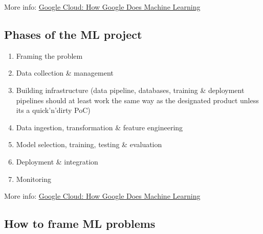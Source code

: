 \documentclass[
]{book}
\begin{document}
More info: \href{https://www.cloudskillsboost.google/course_templates/10}{Google Cloud: How Google Does Machine
Learning}

\hypertarget{phases-of-the-ml-project}{%
\subsection{Phases of the ML project}\label{phases-of-the-ml-project}}

\begin{enumerate}
\def\labelenumi{\arabic{enumi}.}
\item
  Framing the problem
\item
  Data collection \& management
\item
  Building infrastructure (data pipeline, databases, training \&
  deployment pipelines should at least work the same way as the
  designated product unless its a quick'n'dirty PoC)
\item
  Data ingestion, transformation \& feature engineering
\item
  Model selection, training, testing \& evaluation
\item
  Deployment \& integration
\item
  Monitoring
\end{enumerate}

More info: \href{https://www.cloudskillsboost.google/course_templates/10}{Google Cloud: How Google Does Machine
Learning}

\hypertarget{how-to-frame-ml-problems}{%
\subsection{How to frame ML problems}\label{how-to-frame-ml-problems}}
\end{document}
